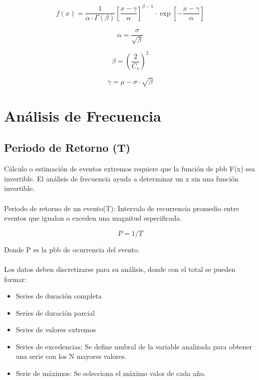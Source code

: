 \begin{equation}
    f(x) = \frac{1}{\alpha \cdot \Gamma(\beta)} \left[\frac{x - \gamma}{\alpha}\right]^{\beta - 1} \cdot \exp\left[-\frac{x - \gamma}{\alpha}\right]
\end{equation}
    
\begin{equation}
    \alpha = \frac{\sigma}{\sqrt{\beta}}
\end{equation}
    
\begin{equation}
    \beta = \left(\frac{2}{C_s}\right)^2
\end{equation}
    
\begin{equation}
    \gamma = \mu - \sigma \cdot \sqrt{\beta}
\end{equation}
    
\section{Análisis de Frecuencia}

\subsection{Periodo de Retorno (T)}

Cálculo o estimación de eventos extremos requiere que la función de pbb F(x) sea invertible. El análisis de frecuencia ayuda a determinar un x sin una función invertible.
\\\\
Periodo de retorno de un evento(T): Intervalo de recurrencia promedio entre eventos que igualan o exceden una magnitud especificada.

\begin{equation}
    P = 1/T
\end{equation}

Donde P es la pbb de ocurrencia del evento.
\\\\

Los datos deben discretizarse para su análisis, donde con el total se pueden formar:
\begin{itemize}
    \item Series de duración completa
    \item Series de duración parcial
    \item Series de valores extremos
    \item Series de excedencias: Se define umbral de la variable analizada para obtener una serie con los N mayores valores.
    \item Serie de máximos: Se selecciona el máximo valor de cada año.
\end{itemize}

